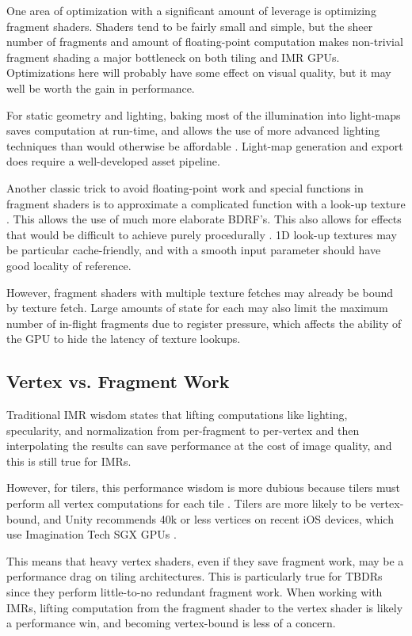 One area of optimization with a significant amount of leverage is optimizing
fragment shaders.  Shaders tend to be fairly small and simple, but the sheer
number of fragments and amount of floating-point computation makes non-trivial
fragment shading a major bottleneck on both tiling and IMR GPUs.  Optimizations
here will probably have some effect on visual quality, but it may well be worth
the gain in performance.

For static geometry and lighting, baking most of the illumination into
light-maps saves computation at run-time, and allows the use of more advanced
lighting techniques than would otherwise be affordable \cite{Miller99}
\cite{Unity11}.  Light-map generation and export does require a well-developed
asset pipeline.

Another classic trick to avoid floating-point work and special functions in
fragment shaders is to approximate a complicated function with a look-up
texture \cite{Pranckevicius11b}.  This allows the use of much more elaborate
BDRF's.  This also allows for effects that would be difficult to achieve purely
procedurally \cite{Mitchell07}.  1D look-up textures may be particular
cache-friendly, and with a smooth input parameter should have good locality of
reference.  

However, fragment shaders with multiple texture fetches may already be bound by
texture fetch.  Large amounts of state for each may also limit the maximum
number of in-flight fragments due to register pressure, which affects the
ability of the GPU to hide the latency of texture lookups.

\subsection{Vertex vs. Fragment Work}
\label{Jon-McCaffrey-Vertex-vs-Fragment-Work}

Traditional IMR wisdom states that lifting computations like lighting,
specularity, and normalization from per-fragment to per-vertex and then
interpolating the results can save performance at the cost of image quality,
and this is still true for IMRs.

However, for tilers, this performance wisdom is more dubious because tilers
must perform
 all vertex computations for each tile \cite{Apple11}.  Tilers
are more likely to
 be vertex-bound, and Unity recommends 40k or less vertices
on recent iOS
 devices, which use Imagination Tech SGX GPUs \cite{Unity11}.

This means that heavy vertex shaders, even if they save fragment work, may be
a
 performance drag on tiling architectures.  This is particularly true for
TBDRs since they perform
 little-to-no redundant fragment work.  When working
with IMRs, lifting
 computation from the fragment shader to the vertex shader
is likely a
 performance win, and becoming vertex-bound is less of a concern.


